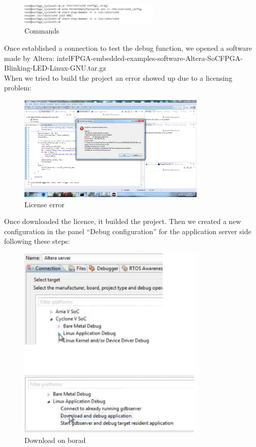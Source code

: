 \begin{figure}[h]
	\centering		\includegraphics[width=0.6\textwidth]{img/comand}
	\caption{Commands}
    	\label{fig:comand}
\end{figure}


Once established a connection to test the debug function, we opened a software made by Altera: intelFPGA-embedded-examples-software-Altera-SoCFPGA-Blinking-LED-Linux-GNU.tar.gz\\
When we tried to build the project an error showed up due to a licensing problem:


\begin{figure}[h]
	\centering		\includegraphics[width=0.8\textwidth]{img/licenseerror}
	\caption{License error}
    	\label{fig:licenseerror}
\end{figure}

Once downloaded the licence, it builded the project. Then we created a new configuration in the panel “Debug configuration” for the application server side following these steps:

\clearpage
\begin{figure}[h]
	\centering		\includegraphics[width=0.8\textwidth]{img/downloadonborad}
	\caption{Download on borad}
    	\label{fig:downloadonborad}
\end{figure}

